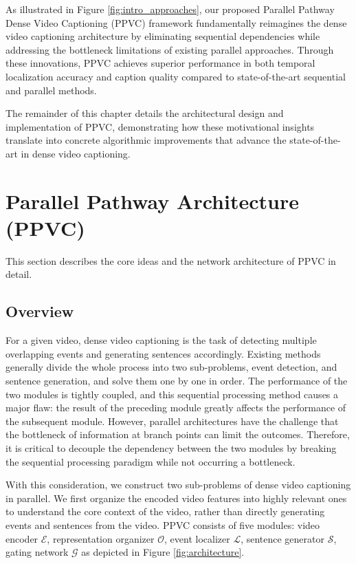 As illustrated in Figure \ref{fig:intro_approaches}, our proposed Parallel Pathway Dense Video Captioning (PPVC) framework fundamentally reimagines the dense video captioning architecture by eliminating sequential dependencies while addressing the bottleneck limitations of existing parallel approaches.
Through these innovations, PPVC achieves superior performance in both temporal localization accuracy and caption quality compared to state-of-the-art sequential and parallel methods.

The remainder of this chapter details the architectural design and implementation of PPVC, demonstrating how these motivational insights translate into concrete algorithmic improvements that advance the state-of-the-art in dense video captioning.

\section{Parallel Pathway Architecture (PPVC)}
This section describes the core ideas and the network architecture of PPVC in detail.

\subsection{Overview}
For a given video, dense video captioning is the task of detecting multiple overlapping events and generating sentences accordingly.
Existing methods generally divide the whole process into two sub-problems, event detection, and sentence generation, and solve them one by one in order.
The performance of the two modules is tightly coupled, and this sequential processing method causes a major flaw: the result of the preceding module greatly affects the performance of the subsequent module.
However, parallel architectures have the challenge that the bottleneck of information at branch points can limit the outcomes.
Therefore, it is critical to decouple the dependency between the two modules by breaking the sequential processing paradigm while not occurring a bottleneck.

With this consideration, we construct two sub-problems of dense video captioning in parallel.
We first organize the encoded video features into highly relevant ones to understand the core context of the video, rather than directly generating events and sentences from the video.
PPVC consists of five modules: video encoder $\mathcal{E}$, representation organizer $\mathcal{O}$, event localizer $\mathcal{L}$, sentence generator $\mathcal{S}$, gating network $\mathcal{G}$ as depicted in Figure \ref{fig:architecture}. 

